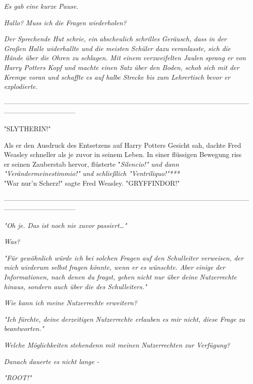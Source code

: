 {\emph{Es gab eine kurze Pause.}

\emph{\emph{Hallo? Muss ich die Fragen wiederholen?}}

\emph{Der Sprechende Hut schrie, ein} \emph{abscheulich schrilles} \emph{Geräusch, dass in der Großen Halle widerhallte und die meisten Schüler dazu veranlasste, sich die Hände über die Ohren zu schlagen. Mit einem verzweifelten Jaulen sprang er von Harry Potters Kopf und machte einen Satz über den Boden, schob sich mit der Krempe voran und schaffte es auf halbe Strecke bis zum Lehrertisch bevor er explodierte.}

--------------------------------------------------------------------------------------------------------------------------------------------

"SLYTHERIN!"

Als er den Ausdruck des Entsetzens auf Harry Potters Gesicht sah, dachte Fred Weasley schneller als je zuvor in seinem Leben. In einer flüssigen Bewegung riss er seinen Zauberstab hervor, flüsterte "\emph{Silencio!" und dann "\emph{Verändermeinestimmio!}" und schließlich "\emph{Ventriliquo!}"***}\\ "War nur'n Scherz!" sagte Fred Weasley. "GRYFFINDOR!"

--------------------------------------------------------------------------------------------------------------------------------------------

\emph{"\emph{Oh je. Das ist noch nie zuvor passiert…}"}

\emph{\emph{Was?}}

\emph{"\emph{Für gewöhnlich würde ich bei solchen Fragen auf den Schulleiter verweisen, der mich}} \emph{\emph{wiederum selbst}} \emph{\emph{fragen könnte, wenn er es wünschte. Aber einige der Informationen, nach denen du fragst, gehen nicht nur über dein}\emph{e}} \emph{\emph{Nutzer}\emph{rechte}} \emph{\emph{hinaus, sondern auch über die des Schulleiters.}"}

\emph{\emph{Wie kann ich meine Nutzer}\emph{rechte}} \emph{\emph{erweitern?}}

\emph{"\emph{Ich fürchte, deine derzeitigen Nutzerrechte erlauben es mir nicht, diese Frage zu beantworten.}"}

\emph{\emph{Welche Möglichkeiten}} \emph{stehen\emph{denn}} \emph{\emph{mit meine}\emph{n}} \emph{\emph{Nutzerrechten zur Verfügung?}}

\emph{Danach dauerte es nicht lange -}

\emph{"ROOT!"}

}
